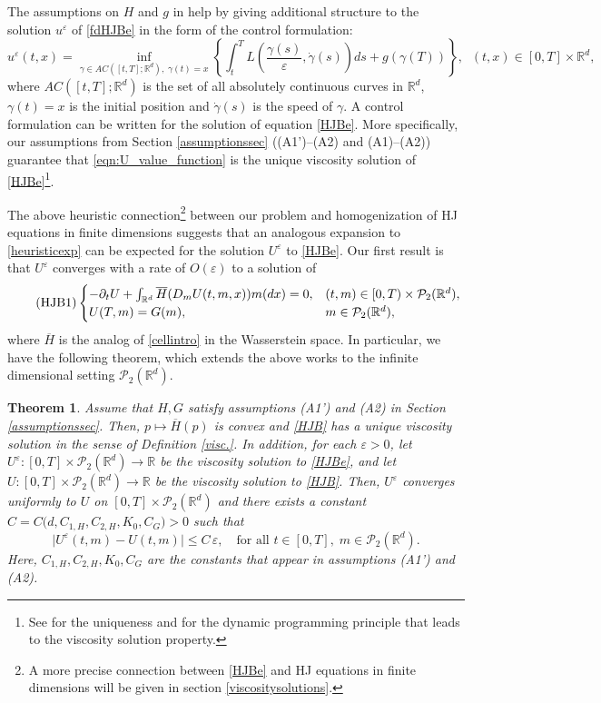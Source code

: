 \documentclass[reqno,11pt]{amsart}
\newtheorem{theorem}{Theorem}[section]
\numberwithin{equation}{section}
\newcommand{\be}{\begin{equation}}
\newcommand{\ee}{\end{equation}}
\newcommand{\R}{\mathbb{R}} %
\newcommand{\e}{\varepsilon}
\newcommand{\nd}{\noindent}
\renewcommand{\bar}{\overline}
\begin{document}
\nd
The assumptions on $H$ and $g$ in \cite{MitakeTranYu2019,TranYu2021} help by giving additional structure to the solution $u^\e$ of \eqref{fdHJBe} in the form of the control formulation:
\be\label{controlfd}
u^\e(t,x)=\inf_{\gamma\in AC([t,T];\R^d),\;\gamma(t)=x}\left\{\int_t^TL\left(\frac{\gamma(s)}{\e},\dot{\gamma}(s)\right)ds +g(\gamma(T))\right\},\;\;(t,x)\in [0,T]\times\R^d,
\ee
where $AC([t,T];\R^d)$ is the set of all absolutely continuous curves in $\R^d$, $\gamma(t)=x$ is the initial position and $\dot{\gamma}(s)$ is the speed of $\gamma$. A control formulation can be written for the solution of equation \eqref{HJBe}. More specifically, our assumptions from Section \ref{assumptionssec} ((A1')--(A2) and (A1)--(A2)) guarantee that \eqref{eqn:U_value_function} is the unique viscosity solution of \eqref{HJBe}\footnote{See \cite[Theorem 7.4]{gangbo2021finite} for the uniqueness and \cite{djete2022mckean1} for the dynamic programming principle that leads to the viscosity solution property.}.
\vspace{2mm}

\nd
The above heuristic connection\footnote{A more precise connection between \eqref{HJBe} and HJ equations in finite dimensions will be given in section \ref{viscositysolutions}.} between our problem and homogenization of HJ equations in finite dimensions suggests that an analogous expansion to \eqref{heuristicexp} can be expected for the solution $U^\e$ to \eqref{HJBe}. Our first result is that $U^\e$ converges with a rate of $O(\e)$ to a solution of
\be\label{HJB}\tag{$\mathrm{HJB1}$}
\begin{cases}
    -\partial_tU+\int_{\R^d}\bar{H}(D_mU(t,m,x))m(dx)=0, &(t,m)\in [0,T)\times \mathcal{P}_2(\R^d),\\
    U(T,m)= G(m), & m\in\mathcal{P}_2(\R^d),
\end{cases}
\ee
where $\overline{H}$ is the analog of \eqref{cellintro} in the Wasserstein space. In particular, we have the following theorem, which extends the above works to the infinite dimensional setting $\mathcal{P}_2(\R^d)$.

\begin{theorem}\label{thm:main1}
Assume that $H,G$ satisfy assumptions (A1') and (A2) in Section \ref{assumptionssec}. Then,  $p\mapsto\overline{H}(p)$ is convex         and \eqref{HJB} has a unique viscosity solution in the sense of Definition \ref{visc.}. In addition, for each $\varepsilon>0$, let $U^\varepsilon \colon [0,T]\times\mathcal{P}_2(\R^d) \to \mathbb{R}$ be the viscosity solution to \eqref{HJBe}, and let $U \colon [0,T]\times\mathcal{P}_2(\R^d) \to \mathbb{R}$ be the viscosity solution to \eqref{HJB}. Then, $U^\varepsilon$ converges uniformly to $U$ on $[0,T]\times\mathcal{P}_2(\R^d)$ and there exists a constant $C = C\big(d, C_{1,H}, C_{2,H}, K_0, C_G\big) > 0$
such that
\be\label{rate1}
\bigl| U^\varepsilon(t,m) - U(t,m) \bigr| \le C\,\varepsilon,
\quad \text{for all } t\in[0,T],\; m\in\mathcal{P}_2(\R^d).
\ee
Here, $C_{1,H}, C_{2,H}, K_0, C_G$ are the constants that appear in assumptions (A1') and (A2).
\end{theorem}
\vspace{2mm}
\end{document}
